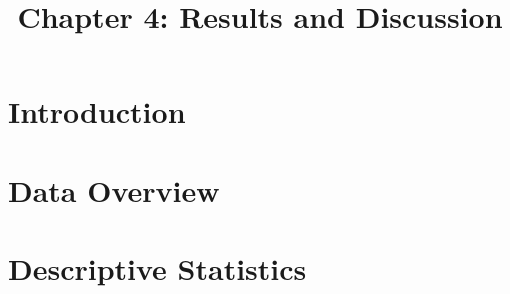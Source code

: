 \documentclass[12pt, a4paper]{article}
\title{\textbf{Chapter 4: Results and Discussion}}
\author{}
\date{}
\begin{document}
\maketitle
\newpage
\tableofcontents
\newpage

\section{Introduction}



\section{Data Overview}



\section{Descriptive Statistics}


\end{document}
